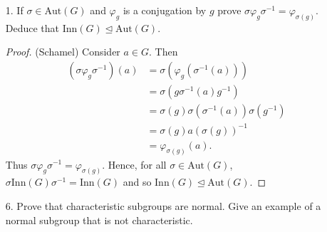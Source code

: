 \documentclass[10pt]{article}
\newcommand{\normsubeq}{\trianglelefteq}
\newcommand{\Aut}{\text{Aut}}
\newcommand{\Inn}{\text{Inn}}
\begin{document}
\begin{itemize}

\item[1.]  If $\sigma \in \Aut(G)$ and $\varphi_g$ is a conjugation by $g$ prove $\sigma\varphi_g \sigma^{-1} = \varphi_{\sigma(g)}$.  Deduce that $\Inn(G) \normsubeq \Aut(G)$.

\begin{proof}
(Schamel)
Consider $a \in G$.  Then
\begin{align*}
(\sigma\varphi_g \sigma^{-1})(a) &= \sigma(\varphi_g(\sigma^{-1}(a))) \\
                                 &= \sigma(g\sigma^{-1}(a)g^{-1}) \\
                                 &= \sigma(g) \sigma(\sigma^{-1}(a)) \sigma(g^{-1}) \\
                                 &= \sigma(g) a (\sigma(g))^{-1} \\
                                 &= \varphi_{\sigma(g)}(a).
\end{align*}
Thus $\sigma\varphi_g \sigma^{-1} = \varphi_{\sigma(g)}$.  Hence, for all $\sigma \in \Aut(G)$, $\sigma \Inn(G) \sigma^{-1} = \Inn(G)$ and so $\Inn(G) \normsubeq \Aut(G)$.
\end{proof}


\item[6.] Prove that characteristic subgroups are normal. Give an example of a normal subgroup that is not characteristic.


\end{itemize}
\end{document}
